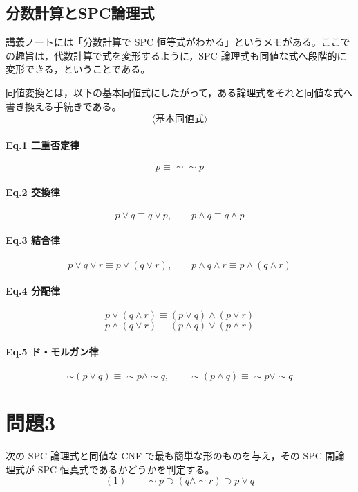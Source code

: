 \documentclass[../main.tex]{subfiles}
\begin{document}
\subsection{分数計算とSPC論理式}

講義ノートには「分数計算で SPC 恒等式がわかる」というメモがある。ここでの趣旨は，代数計算で式を変形するように，SPC 論理式も同値な式へ段階的に変形できる，ということである。

同値変換とは，以下の基本同値式にしたがって，ある論理式をそれと同値な式へ書き換える手続きである。
\[
  \langle \text{基本同値式} \rangle
\]

\paragraph{Eq.1 二重否定律}
\[
  p \equiv \sim\sim p
\]

\paragraph{Eq.2 交換律}
\[
  p \lor q \equiv q \lor p,
  \qquad
  p \land q \equiv q \land p
\]

\paragraph{Eq.3 結合律}
\[
  p \lor q \lor r \equiv p \lor (q \lor r),
  \qquad
  p \land q \land r \equiv p \land (q \land r)
\]

\paragraph{Eq.4 分配律}
\[
  p \lor (q \land r)
  \equiv
  (p \lor q) \land (p \lor r)
\]
\[
  p \land (q \lor r)
  \equiv
  (p \land q) \lor (p \land r)
\]

\paragraph{Eq.5 ド・モルガン律}
\[
  \sim(p \lor q)
  \equiv
  \sim p \land \sim q,
  \qquad
  \sim(p \land q)
  \equiv
  \sim p \lor \sim q
\]

\section{問題3}

次の SPC 論理式と同値な CNF で最も簡単な形のものを与え，その SPC 開論理式が SPC 恒真式であるかどうかを判定する。
\[
  (1)
  \qquad
  \sim p \supset (q \land \sim r) \supset p \lor q
\]
\end{document}
